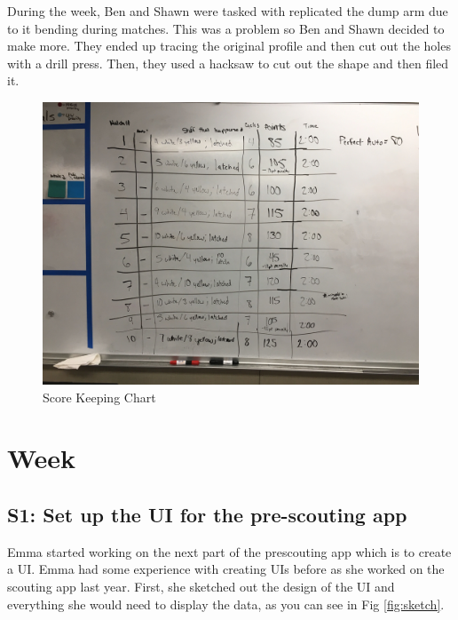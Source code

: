 \documentclass{article}
\begin{document}
During the week, Ben and Shawn were tasked with replicated the dump arm due to it bending during matches. This was a problem so Ben and Shawn decided to make more. They ended up tracing the original profile and then cut out the holes with a drill press. Then, they used a hacksaw to cut out the shape and then filed it. 

\begin{figure}
    \centering
    \includegraphics[width=.6 \textwidth]{23_02-04/images/IMG_1512.JPG}
    \caption{Score Keeping Chart}
    \label{fig:chart}
\end{figure}


\clearpage \newpage \section{Week \thesection} 
\subsection{S1: Set up the UI for the pre-scouting app}

Emma started working on the next part of the prescouting app which is to create a UI. Emma had some experience with creating UIs before as she worked on the scouting app last year. First, she sketched out the design of the UI and everything she would need to display the data, as you can see in Fig \ref{fig:sketch}. \\
\end{document}
